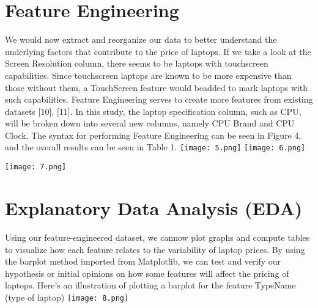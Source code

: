 \documentclass[
11pt, %
english, %
singlespacing, %
headsepline, %
]{MastersDoctoralThesis} %
\begin{document}
\section{ Feature Engineering}
We would now extract and reorganize our data to
better understand the underlying factors that contribute to the price of laptops. If we take a look at 
the Screen Resolution column, there seems to be 
laptops with touchscreen capabilities. Since 
touchscreen laptops are known to be more expensive 
than those without them, a TouchScreen feature 
would beadded to mark laptops with such capabilities.
Feature Engineering serves to create more 
features from existing datasets [10], [11]. In this 
study, the laptop specification column, such as CPU, 
will be broken down into several new columns, 
namely CPU Brand and CPU Clock. The syntax for 
performing Feature Engineering can be seen in 
Figure 4, and the overall results can be seen in Table 
1.\hfill\break\break
\vspace*{0cm}
    \hspace*{-2cm}                                                           
        \texttt{[image: 5.png]}
\break
\vspace*{0cm}
    \hspace*{4cm}                                                           
        \texttt{[image: 6.png]}

\vspace*{0cm}
    \hspace*{5cm}                                                           
        \texttt{[image: 7.png]}

\section{Explanatory Data Analysis (EDA)}
Using our feature-engineered dataset, we cannow plot 
graphs and compute tables to visualize how each 
feature relates to the variability of laptop prices.
By using the barplot method imported from
Matplotlib, we can test and verify our hypothesis or 
initial opinions on how some features will affect the
pricing of laptops.
Here’s an illustration of plotting a barplot for the
feature TypeName (type of laptop)\break\break
        \texttt{[image: 8.png]}\break\break\break
\end{document}
